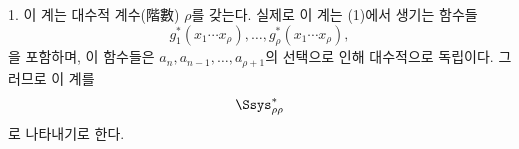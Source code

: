 
1. 이 계는 대수적 계수(階數) $\rho$를 갖는다. 실제로 이 계는 (1)에서 생기는 함수들
\[
g_1^*(x_1\cdots x_\rho),\ldots,g_\rho^*(x_1\cdots x_\rho),
\]
을 포함하며, 이 함수들은 $a_n,a_{n-1},\ldots,a_{\rho+1}$의 선택으로 인해 대수적으로 독립이다. 그러므로 이 계를
\[
\Ssys^*_{\rho\rho}
\]
로 나타내기로 한다.
